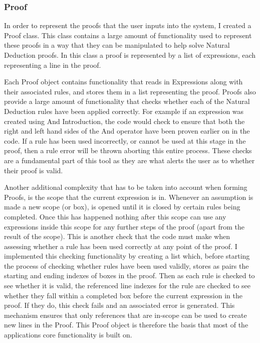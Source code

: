 \subsubsection{Proof}

In order to represent the proofs that the user inputs into the system, I created a Proof class. This class contains a large amount of functionality used to represent these proofs in a way that they can be manipulated to help solve Natural Deduction proofs. In this class a proof is represented by a list of expressions, each representing a line in the proof. 

Each Proof object contains functionality that reads in Expressions along with their associated rules, and stores them in a list representing the proof. Proofs also provide a large amount of functionality that checks whether each of the Natural Deduction rules have been applied correctly.  For example if an expression was created using And Introduction, the code would check to ensure that both the right and left hand sides of the And operator have been proven earlier on in the code. If a rule has been used incorrectly, or cannot be used at this stage in the proof, then a rule error will be thrown aborting this entire process. These checks are a fundamental part of this tool as they are what alerts the user as to whether their proof is valid. 

Another additional complexity that has to be taken into account when forming Proofs, is the scope that the current expression is in. Whenever an assumption is made a new scope (or box), is opened until it is closed by certain rules being completed. Once this has happened nothing after this scope can use any expressions inside this scope for any further steps of the proof (apart from the result of the scope). This is another check that the code must make when assessing whether a rule has been used correctly at any point of the proof. I implemented this checking functionality by creating a list which, before starting the process of checking whether rules have been used validly, stores as pairs the starting and ending indexes of boxes in the proof. Then as each rule is checked to see whether it is valid, the referenced line indexes for the rule are checked to see whether they fall within a completed box before the current expression in the proof. If they do, this check fails and an associated error is generated. This mechanism ensures that only references that are in-scope can be used to create new lines in the Proof. This Proof object is therefore the basis that most of the applications core functionality is built on.

